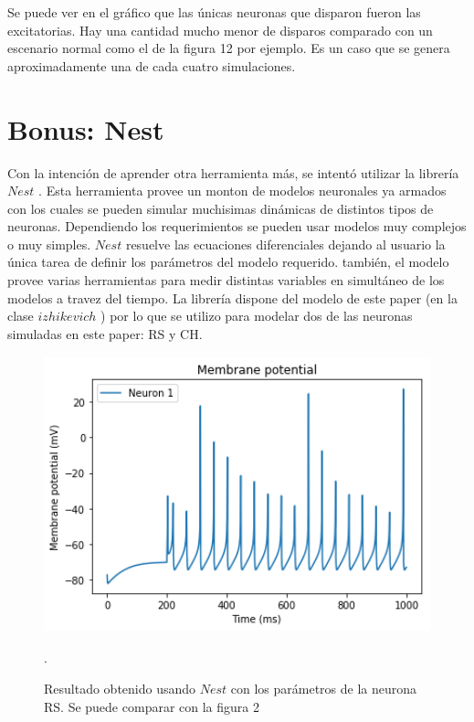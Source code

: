 \documentclass[12pt]{article}
\begin{document}
\newpage

Se puede ver en el gráfico que las únicas neuronas que disparon fueron las excitatorias.
Hay una cantidad mucho menor de disparos comparado con un escenario normal como el de la figura 12 por ejemplo.
Es un caso que se genera aproximadamente una de cada cuatro simulaciones.

\newpage

\section{Bonus: Nest}

Con la intención de aprender otra herramienta más, se intentó utilizar la librería $Nest$ \cite{Nest}. Esta herramienta provee un monton de modelos neuronales ya armados con los cuales se pueden simular muchisimas dinámicas de distintos tipos de neuronas.
Dependiendo los requerimientos se pueden usar modelos muy complejos o muy simples.
$Nest$ resuelve las ecuaciones diferenciales dejando al usuario la única tarea de definir los parámetros del modelo requerido.
también, el modelo provee varias herramientas para medir distintas variables en simultáneo de los modelos a travez del tiempo.
La librería dispone del modelo de este paper (en la clase $izhikevich$ \cite{nest_izhikevich}) por lo que se utilizo para modelar dos de las neuronas simuladas en este paper: RS y CH.

\begin{figure}[h!]
    \centering
        \includegraphics[height=8cm]{images/RS_nest.png}
    \caption[fontsize=2pt]{Resultado obtenido usando $Nest$ con los parámetros de la neurona RS. Se puede comparar con la figura 2}.
\end{figure}
\end{document}
